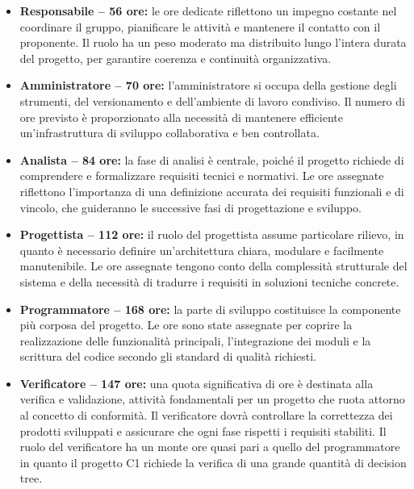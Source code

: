 \documentclass[a4paper,12pt]{article}
\begin{document}
\begin{itemize}
    \item \textbf{Responsabile – 56 ore:} le ore dedicate riflettono un impegno costante nel coordinare il gruppo, pianificare le attività e mantenere il contatto con il proponente. Il ruolo ha un peso moderato ma distribuito lungo l’intera durata del progetto, per garantire coerenza e continuità organizzativa.
    
    \item \textbf{Amministratore – 70 ore:} l’amministratore si occupa della gestione degli strumenti, del versionamento e dell’ambiente di lavoro condiviso. Il numero di ore previsto è proporzionato alla necessità di mantenere efficiente un’infrastruttura di sviluppo collaborativa e ben controllata.
    
    \item \textbf{Analista – 84 ore:} la fase di analisi è centrale, poiché il progetto richiede di comprendere e formalizzare requisiti tecnici e normativi. Le ore assegnate riflettono l’importanza di una definizione accurata dei requisiti funzionali e di vincolo, che guideranno le successive fasi di progettazione e sviluppo.
    
    \item \textbf{Progettista – 112 ore:} il ruolo del progettista assume particolare rilievo, in quanto è necessario definire un’architettura chiara, modulare e facilmente manutenibile. Le ore assegnate tengono conto della complessità strutturale del sistema e della necessità di tradurre i requisiti in soluzioni tecniche concrete.
    
    \item \textbf{Programmatore – 168 ore:} la parte di sviluppo costituisce la componente più corposa del progetto. Le ore sono state assegnate per coprire la realizzazione delle funzionalità principali, l’integrazione dei moduli e la scrittura del codice secondo gli standard di qualità richiesti.
    
    \item \textbf{Verificatore – 147 ore:} una quota significativa di ore è destinata alla verifica e validazione, attività fondamentali per un progetto che ruota attorno al concetto di conformità. Il verificatore dovrà controllare la correttezza dei prodotti sviluppati e assicurare che ogni fase rispetti i requisiti stabiliti. Il ruolo del verificatore ha un monte ore quasi pari a quello del programmatore in quanto il progetto C1 richiede la verifica di una grande quantità di decision tree.  
\end{itemize}
\end{document}
